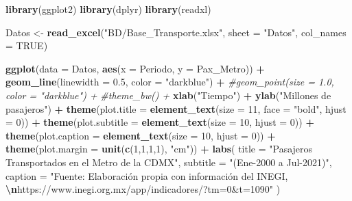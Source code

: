 \documentclass[
]{book}
\newenvironment{Shaded}{\begin{snugshade}}{\end{snugshade}}
\newcommand{\AttributeTok}[1]{\textcolor[rgb]{0.13,0.29,0.53}{#1}}
\newcommand{\CommentTok}[1]{\textcolor[rgb]{0.56,0.35,0.01}{\textit{#1}}}
\newcommand{\ConstantTok}[1]{\textcolor[rgb]{0.56,0.35,0.01}{#1}}
\newcommand{\DecValTok}[1]{\textcolor[rgb]{0.00,0.00,0.81}{#1}}
\newcommand{\FloatTok}[1]{\textcolor[rgb]{0.00,0.00,0.81}{#1}}
\newcommand{\FunctionTok}[1]{\textcolor[rgb]{0.13,0.29,0.53}{\textbf{#1}}}
\newcommand{\NormalTok}[1]{#1}
\newcommand{\OtherTok}[1]{\textcolor[rgb]{0.56,0.35,0.01}{#1}}
\newcommand{\SpecialCharTok}[1]{\textcolor[rgb]{0.81,0.36,0.00}{\textbf{#1}}}
\newcommand{\StringTok}[1]{\textcolor[rgb]{0.31,0.60,0.02}{#1}}
\begin{document}
\begin{Shaded}
\begin{Highlighting}[]
\FunctionTok{library}\NormalTok{(ggplot2)}
\FunctionTok{library}\NormalTok{(dplyr)}
\FunctionTok{library}\NormalTok{(readxl)}

\NormalTok{Datos }\OtherTok{\textless{}{-}} \FunctionTok{read\_excel}\NormalTok{(}\StringTok{"BD/Base\_Transporte.xlsx"}\NormalTok{, }
                    \AttributeTok{sheet =} \StringTok{"Datos"}\NormalTok{, }\AttributeTok{col\_names =} \ConstantTok{TRUE}\NormalTok{)}

\FunctionTok{ggplot}\NormalTok{(}\AttributeTok{data =}\NormalTok{ Datos, }\FunctionTok{aes}\NormalTok{(}\AttributeTok{x =}\NormalTok{ Periodo, }\AttributeTok{y =}\NormalTok{ Pax\_Metro)) }\SpecialCharTok{+} 
  \FunctionTok{geom\_line}\NormalTok{(}\AttributeTok{linewidth =} \FloatTok{0.5}\NormalTok{, }\AttributeTok{color =} \StringTok{"darkblue"}\NormalTok{) }\SpecialCharTok{+}
  \CommentTok{\#geom\_point(size = 1.0, color = "darkblue") + }
  \CommentTok{\#theme\_bw() + }
  \FunctionTok{xlab}\NormalTok{(}\StringTok{"Tiempo"}\NormalTok{) }\SpecialCharTok{+} 
  \FunctionTok{ylab}\NormalTok{(}\StringTok{"Millones de pasajeros"}\NormalTok{) }\SpecialCharTok{+} 
  \FunctionTok{theme}\NormalTok{(}\AttributeTok{plot.title =} \FunctionTok{element\_text}\NormalTok{(}\AttributeTok{size =} \DecValTok{11}\NormalTok{, }\AttributeTok{face =} \StringTok{"bold"}\NormalTok{, }\AttributeTok{hjust =} \DecValTok{0}\NormalTok{)) }\SpecialCharTok{+} 
  \FunctionTok{theme}\NormalTok{(}\AttributeTok{plot.subtitle =} \FunctionTok{element\_text}\NormalTok{(}\AttributeTok{size =} \DecValTok{10}\NormalTok{, }\AttributeTok{hjust =} \DecValTok{0}\NormalTok{)) }\SpecialCharTok{+} 
  \FunctionTok{theme}\NormalTok{(}\AttributeTok{plot.caption =} \FunctionTok{element\_text}\NormalTok{(}\AttributeTok{size =} \DecValTok{10}\NormalTok{, }\AttributeTok{hjust =} \DecValTok{0}\NormalTok{)) }\SpecialCharTok{+}
  \FunctionTok{theme}\NormalTok{(}\AttributeTok{plot.margin =} \FunctionTok{unit}\NormalTok{(}\FunctionTok{c}\NormalTok{(}\DecValTok{1}\NormalTok{,}\DecValTok{1}\NormalTok{,}\DecValTok{1}\NormalTok{,}\DecValTok{1}\NormalTok{), }\StringTok{"cm"}\NormalTok{)) }\SpecialCharTok{+}
  \FunctionTok{labs}\NormalTok{(}
    \AttributeTok{title =} \StringTok{"Pasajeros Transportados en el Metro de la CDMX"}\NormalTok{,}
    \AttributeTok{subtitle =} \StringTok{"(Ene{-}2000 a Jul{-}2021)"}\NormalTok{,}
    \AttributeTok{caption =} \StringTok{"Fuente: Elaboración propia con información del INEGI, }\SpecialCharTok{\textbackslash{}n}\StringTok{https://www.inegi.org.mx/app/indicadores/?tm=0\&t=1090"}
\NormalTok{  )}
\end{Highlighting}
\end{Shaded}
\end{document}
